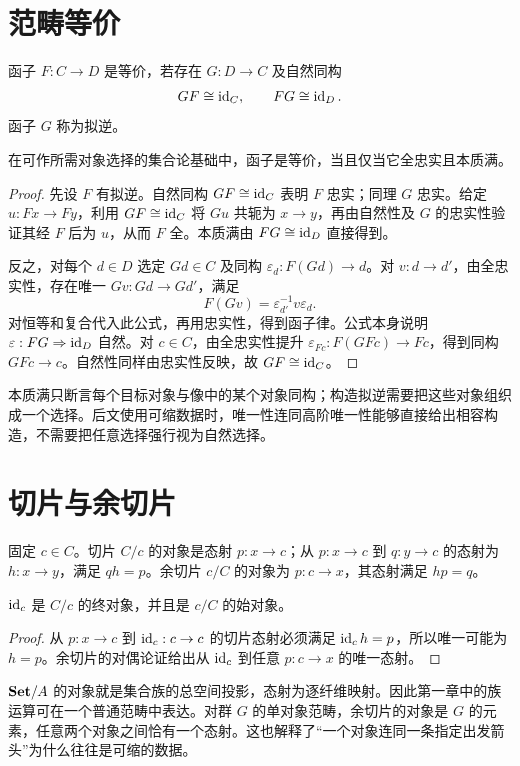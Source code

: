 \section{范畴等价}
\begin{definition}[范畴等价]
函子 $F:C\to D$ 是等价，若存在 $G:D\to C$ 及自然同构
\[
GF\cong\operatorname{id}_C,\qquad FG\cong\operatorname{id}_D.
\]
函子 $G$ 称为拟逆。
\end{definition}
\begin{theorem}[等价的判据]
在可作所需对象选择的集合论基础中，函子是等价，当且仅当它全忠实且本质满。
\end{theorem}
\begin{proof}
先设 $F$ 有拟逆。自然同构 $GF\cong\operatorname{id}_C$ 表明 $F$ 忠实；同理 $G$ 忠实。给定 $u:Fx\to Fy$，利用 $GF\cong\operatorname{id}_C$ 将 $Gu$ 共轭为 $x\to y$，再由自然性及 $G$ 的忠实性验证其经 $F$ 后为 $u$，从而 $F$ 全。本质满由 $FG\cong\operatorname{id}_D$ 直接得到。

反之，对每个 $d\in D$ 选定 $Gd\in C$ 及同构 $\varepsilon_d:F(Gd)\to d$。对 $v:d\to d'$，由全忠实性，存在唯一 $Gv:Gd\to Gd'$，满足
\[
F(Gv)=\varepsilon_{d'}^{-1}v\varepsilon_d.
\]
对恒等和复合代入此公式，再用忠实性，得到函子律。公式本身说明 $\varepsilon:FG\Rightarrow\operatorname{id}_D$ 自然。对 $c\in C$，由全忠实性提升 $\varepsilon_{Fc}:F(GFc)\to Fc$，得到同构 $GFc\to c$。自然性同样由忠实性反映，故 $GF\cong\operatorname{id}_C$。
\end{proof}
\begin{remark}
本质满只断言每个目标对象与像中的某个对象同构；构造拟逆需要把这些对象组织成一个选择。后文使用可缩数据时，唯一性连同高阶唯一性能够直接给出相容构造，不需要把任意选择强行视为自然选择。
\end{remark}

\section{切片与余切片}
\begin{definition}[切片范畴]
固定 $c\in C$。切片 $C/c$ 的对象是态射 $p:x\to c$；从 $p:x\to c$ 到 $q:y\to c$ 的态射为 $h:x\to y$，满足 $qh=p$。余切片 $c/C$ 的对象为 $p:c\to x$，其态射满足 $hp=q$。
\end{definition}
\begin{proposition}
$\operatorname{id}_c$ 是 $C/c$ 的终对象，并且是 $c/C$ 的始对象。
\end{proposition}
\begin{proof}
从 $p:x\to c$ 到 $\operatorname{id}_c:c\to c$ 的切片态射必须满足 $\operatorname{id}_ch=p$，所以唯一可能为 $h=p$。余切片的对偶论证给出从 $\operatorname{id}_c$ 到任意 $p:c\to x$ 的唯一态射。
\end{proof}
\begin{example}
$\mathbf{Set}/A$ 的对象就是集合族的总空间投影，态射为逐纤维映射。因此第一章中的族运算可在一个普通范畴中表达。对群 $G$ 的单对象范畴，余切片的对象是 $G$ 的元素，任意两个对象之间恰有一个态射。这也解释了“一个对象连同一条指定出发箭头”为什么往往是可缩的数据。
\end{example}
